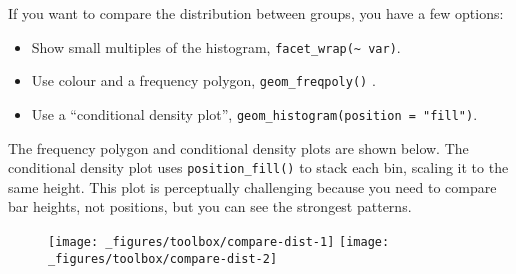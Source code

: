 If you want to compare the distribution between groups, you have a few
options:

\begin{itemize}
\tightlist
\item
  Show small multiples of the histogram,
  \texttt{facet\_wrap(\textasciitilde{}\ var)}.
\item
  Use colour and a frequency polygon, \texttt{geom\_freqpoly()} .
   
\item
  Use a ``conditional density plot'',
  \texttt{geom\_histogram(position\ =\ "fill")}.
\end{itemize}

The frequency polygon and conditional density plots are shown below. The
conditional density plot uses \texttt{position\_fill()} to stack each
bin, scaling it to the same height. This plot is perceptually
challenging because you need to compare bar heights, not positions, but
you can see the strongest patterns. 

\begin{Shaded}
\begin{Highlighting}[]
\StringTok{ }
\StringTok{  }\NormalTok{(}\NormalTok{(}  \NormalTok{, } \NormalTok{) +}
\StringTok{  }\NormalTok{(}\NormalTok{, }\NormalTok{) +}\StringTok{ }
\StringTok{  }\NormalTok{(} \NormalTok{)}
\StringTok{ }
\StringTok{  }\NormalTok{(}\NormalTok{(}  \NormalTok{, } \NormalTok{,}
     \NormalTok{) +}
\StringTok{  }\NormalTok{(}\NormalTok{, }\NormalTok{) +}\StringTok{ }
\StringTok{  }\NormalTok{(} \NormalTok{)}
\end{Highlighting}
\end{Shaded}

\begin{figure}[H]
  \texttt{[image: \_figures/toolbox/compare-dist-1]}%
  \texttt{[image: \_figures/toolbox/compare-dist-2]}
\end{figure}

